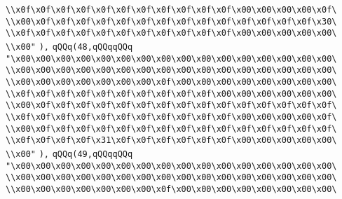 \verb|\\x0f\x0f\x0f\x0f\x0f\x0f\x0f\x0f\x0f\x0f\x0f\x00\x00\x00\x00\x0f\|\newline
\verb|\\x00\x0f\x0f\x0f\x0f\x0f\x0f\x0f\x0f\x0f\x0f\x0f\x0f\x0f\x0f\x30\|\newline
\verb|\\x0f\x0f\x0f\x0f\x0f\x0f\x0f\x0f\x0f\x0f\x0f\x00\x00\x00\x00\x00\|\newline
\verb|\\x00"|\newline
\verb|),|\newline
\verb|qQQq(48,qQQqqQQq|\newline
\verb|"\x00\x00\x00\x00\x00\x00\x00\x00\x00\x00\x00\x00\x00\x00\x00\x00\|\newline
\verb|\\x00\x00\x00\x00\x00\x00\x00\x00\x00\x00\x00\x00\x00\x00\x00\x00\|\newline
\verb|\\x00\x00\x00\x00\x00\x00\x00\x0f\x00\x00\x00\x00\x00\x00\x00\x00\|\newline
\verb|\\x0f\x0f\x0f\x0f\x0f\x0f\x0f\x0f\x0f\x0f\x00\x00\x00\x00\x00\x00\|\newline
\verb|\\x00\x0f\x0f\x0f\x0f\x0f\x0f\x0f\x0f\x0f\x0f\x0f\x0f\x0f\x0f\x0f\|\newline
\verb|\\x0f\x0f\x0f\x0f\x0f\x0f\x0f\x0f\x0f\x0f\x0f\x00\x00\x00\x00\x0f\|\newline
\verb|\\x00\x0f\x0f\x0f\x0f\x0f\x0f\x0f\x0f\x0f\x0f\x0f\x0f\x0f\x0f\x0f\|\newline
\verb|\\x0f\x0f\x0f\x0f\x31\x0f\x0f\x0f\x0f\x0f\x0f\x00\x00\x00\x00\x00\|\newline
\verb|\\x00"|\newline
\verb|),|\newline
\verb|qQQq(49,qQQqqQQq|\newline
\verb|"\x00\x00\x00\x00\x00\x00\x00\x00\x00\x00\x00\x00\x00\x00\x00\x00\|\newline
\verb|\\x00\x00\x00\x00\x00\x00\x00\x00\x00\x00\x00\x00\x00\x00\x00\x00\|\newline
\verb|\\x00\x00\x00\x00\x00\x00\x00\x0f\x00\x00\x00\x00\x00\x00\x00\x00\|\newline
